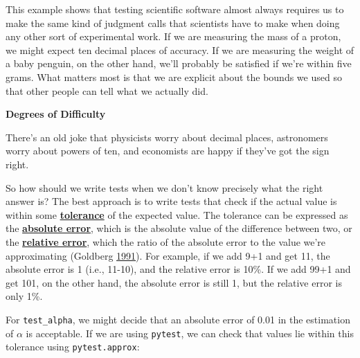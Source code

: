 \documentclass[
]{krantz}
\renewenvironment{quote}{\begin{VF}}{\end{VF}}
\newcommand{\gref}[2]{\hyperlink{#2}{\textbf{#1}}}
\begin{document}
This example shows that testing scientific software
almost always requires us to make the same kind of judgment calls
that scientists have to make when doing any other sort of experimental work.
If we are measuring the mass of a proton,
we might expect ten decimal places of accuracy.
If we are measuring the weight of a baby penguin,
on the other hand,
we'll probably be satisfied if we're within five grams.
What matters most is that we are explicit about the bounds we used
so that other people can tell what we actually did.

\begin{quote}
\textbf{Degrees of Difficulty}

There's an old joke that physicists worry about decimal places,
astronomers worry about powers of ten,
and economists are happy if they've got the sign right.
\end{quote}

So how should we write tests when we don't know precisely what the right answer is?
The best approach is to write tests that check
if the actual value is within some \gref{tolerance}{tolerance} of the expected value.
The tolerance can be expressed as the \gref{absolute error}{absolute\_error},
which is the absolute value of the difference between two,
or the \gref{relative error}{relative\_error},
which the ratio of the absolute error to the value we're approximating (Goldberg \protect\hyperlink{ref-Gold1991}{1991}).
For example,
if we add 9+1 and get 11,
the absolute error is 1 (i.e., 11-10),
and the relative error is 10\%.
If we add 99+1 and get 101,
on the other hand,
the absolute error is still 1,
but the relative error is only 1\%.

For \texttt{test\_alpha},
we might decide that an absolute error of 0.01 in the estimation of \(\alpha\) is acceptable.
If we are using \texttt{pytest},
we can check that values lie within this tolerance using \texttt{pytest.approx}:
\end{document}
